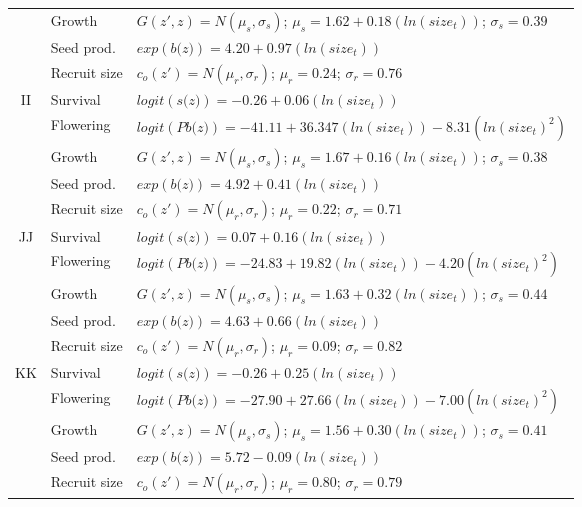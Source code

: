 \documentclass[12pt, letterpaper]{article}
\begin{document}
\begin{spacing}{1.3}
\begin{longtable}[ht!]{c|l|p{}}
         & Growth  &  $G(z',z) = N(\mu_s, \sigma_s)$; $\mu_s = 1.62 + 0.18(ln(size_t))$; $\sigma_s = 0.39$\\
         \rowcolor[gray]{.95}& Seed prod.  & $exp(\textit{b(z)}) = 4.20 + 0.97(ln(size_t))$  \\
         & Recruit size  &  $c_o(z') = N(\mu_r, \sigma_r)$; $\mu_r = 0.24$; $\sigma_r = 0.76$ \\ 
         \hline
         \rowcolor[gray]{.95}II  &  Survival  &  $logit(\textit{s(z)})= -0.26+0.06(ln(size_t))$ \\
         & Flowering  & $logit(\textit{Pb(z)})  = -41.11 + 36.347(ln(size_t)) -8.31(ln(size_t)^2)$ \\
         \rowcolor[gray]{.95}& Growth  &  $G(z',z) = N(\mu_s, \sigma_s)$; $\mu_s = 1.67 + 0.16(ln(size_t))$; $\sigma_s = 0.38$\\
         & Seed prod.  & $exp(\textit{b(z)}) = 4.92 + 0.41(ln(size_t))$  \\
         \rowcolor[gray]{.95}& Recruit size  &  $c_o(z') = N(\mu_r, \sigma_r)$; $\mu_r = 0.22$; $\sigma_r = 0.71$ \\
         \hline
         JJ  &  Survival  &  $logit(\textit{s(z)})= 0.07+0.16(ln(size_t))$ \\
         \rowcolor[gray]{.95}& Flowering  & $logit(\textit{Pb(z)})  = -24.83 + 19.82(ln(size_t)) -4.20(ln(size_t)^2)$ \\
         & Growth  &  $G(z',z) = N(\mu_s, \sigma_s)$; $\mu_s = 1.63 + 0.32(ln(size_t))$; $\sigma_s = 0.44$\\
         \rowcolor[gray]{.95}& Seed prod.  & $exp(\textit{b(z)}) = 4.63 + 0.66(ln(size_t))$  \\
         & Recruit size  &  $c_o(z') = N(\mu_r, \sigma_r)$; $\mu_r = 0.09$; $\sigma_r = 0.82$ \\
         \hline
         \rowcolor[gray]{.95}KK  &  Survival  &  $logit(\textit{s(z)})= -0.26+0.25(ln(size_t))$ \\
         & Flowering  & $logit(\textit{Pb(z)})  = -27.90 + 27.66(ln(size_t)) -7.00(ln(size_t)^2)$ \\
        \rowcolor[gray]{.95} & Growth  &  $G(z',z) = N(\mu_s, \sigma_s)$; $\mu_s = 1.56 + 0.30(ln(size_t))$; $\sigma_s = 0.41$\\
         & Seed prod.  & $exp(\textit{b(z)}) = 5.72 -0.09(ln(size_t))$  \\
         \rowcolor[gray]{.95}& Recruit size  &  $c_o(z') = N(\mu_r, \sigma_r)$; $\mu_r = 0.80$; $\sigma_r = 0.79$ \\

\end{longtable}
\end{spacing}
\end{document}
